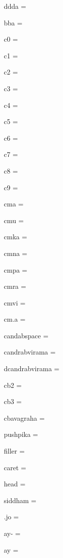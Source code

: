 \documentclass{article}
\begin{document}
\begin{multicols}{6}
\noindent ddda = {\fdeva {}}\par
\noindent bba = {\fdeva {}}\par
\noindent c0 = {\fdeva {}}\par
\noindent c1 = {\fdeva {}}\par
\noindent c2 = {\fdeva {}}\par
\noindent c3 = {\fdeva {}}\par
\noindent c4 = {\fdeva {}}\par
\noindent c5 = {\fdeva {}}\par
\noindent c6 = {\fdeva {}}\par
\noindent c7 = {\fdeva {}}\par
\noindent c8 = {\fdeva {}}\par
\noindent c9 = {\fdeva {}}\par
\noindent cma = {\fdeva {}}\par
\noindent cmu = {\fdeva {}}\par
\noindent cmka = {\fdeva {}}\par
\noindent cmna = {\fdeva {}}\par
\noindent cmpa = {\fdeva {}}\par
\noindent cmra = {\fdeva {}}\par
\noindent cmvi = {\fdeva {}}\par
\noindent cm.a = {\fdeva {}}\par
\noindent candabspace = {\fdeva {}}\par
\noindent candrabvirama = {\fdeva {}}\par
\noindent dcandrabvirama = {\fdeva {}}\par
\noindent cb2 = {\fdeva {}}\par
\noindent cb3 = {\fdeva {}}\par
\noindent cbavagraha = {\fdeva {}}\par
\noindent pushpika = {\fdeva {}}\par
\noindent filler = {\fdeva {}}\par
\noindent caret = {\fdeva {}}\par
\noindent head = {\fdeva {}}\par
\noindent siddham = {\fdeva {}}\par
\noindent .jo = {\fdeva {}}\par
\noindent ay- = {\fdeva {}}\par
\noindent ay = {\fdeva {}}\par
\end{multicols}


{\fdeva {}}
\end{document}

